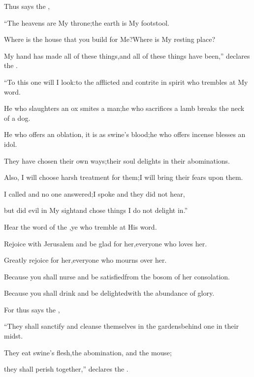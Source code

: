 
\begin{inparaenum}
  \pa{} Thus says the \lord,%

  \pb{}``The heavens are My throne;\pa{}the earth is My footstool.%

  \pb{}Where is the house that you build for Me?\pa{}Where is My resting place?%

  \pb{} My hand has made all of these things,\pa{}and all of these things have been,'' declares the \lord.%

  \pb{}``To this one will I look:\pa{}to the afflicted and contrite in spirit who trembles at My word.%

  \pb{} He who slaughters an ox smites a man;\pa{}he who sacrifices a lamb breaks the neck of a dog.%

  \pc{}He who offers an oblation, it is as swine's blood;\pa{}he who offers incense blesses an idol.%

  \pc{}They have chosen their own ways;\pa{}their soul delights in their abominations.%

  \pb{} Also, I will choose harsh treatment for them;\pa{}I will bring their fears upon them.%

  \pc{}I called and no one answered;\pa{}I spoke and they did not hear,%

  \pc{}but did evil in My sight\pa{}and chose things I do not delight in.''%

  \pa{} Hear the word of the \lord,\pa{}ye who tremble at His word.%

  \pa{} Rejoice with Jerusalem and be glad for her,\pa{}everyone who loves her.%

  \pb{}Greatly rejoice for her,\pa{}everyone who mourns over her.%

  \pa{} Because you shall nurse and be satisfied\pa{}from the bosom of her consolation.%

  \pb{}Because you shall drink and be delighted\pa{}with the abundance of glory.%

  \pa{} For thus says the \lord,%

  \pc{} ``They shall sanctify and cleanse themselves in the gardens\pa{}behind one in their midst.%

  \pc{}They eat swine's flesh,\pa{}the abomination, and the mouse;%

  \pc{}they shall perish together,'' declares the \lord.%
\end{inparaenum}
